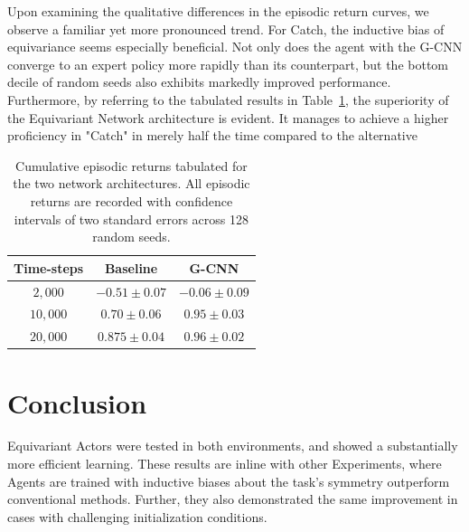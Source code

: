 Upon examining the qualitative differences in the episodic return curves, we observe a familiar yet more pronounced trend. For Catch, the inductive bias of equivariance seems especially beneficial. Not only does the agent with the G-CNN converge to an expert policy more rapidly than its counterpart, but the bottom decile of random seeds also exhibits markedly improved performance. Furthermore, by referring to the tabulated results in Table~\ref{tab:actor-critic_catch}, the superiority of the Equivariant Network architecture is evident. It manages to achieve a higher proficiency in "Catch" in merely half the time compared to the alternative

\begin{table}
	\centering
	\begin{tabular}{|c|c|c|}
		\hline
		Time-steps & Baseline         & G-CNN                     \\
		\hline
		$2, 000$   & $- 0.51\pm 0.07$ & $\mathbf{-0.06 \pm 0.09}$ \\
		$10, 000$  & $0.70 \pm 0.06$  & $\mathbf{0.95 \pm 0.03} $ \\
		$20,000$   & $0.875 \pm 0.04$ & $\mathbf{0.96\pm 0.02}$   \\
		\hline
	\end{tabular}
	\caption{Cumulative episodic returns tabulated for the two network architectures. All episodic returns are recorded with confidence intervals of two standard errors across 128 random seeds.}
	\label{tab:actor-critic_catch}
\end{table}
\section{Conclusion}
Equivariant Actors were tested in both environments, and showed a substantially more efficient learning. These results are inline with other Experiments, where Agents are trained with inductive biases about the task's symmetry outperform conventional methods. Further, they also demonstrated the same improvement in cases with challenging initialization conditions.


